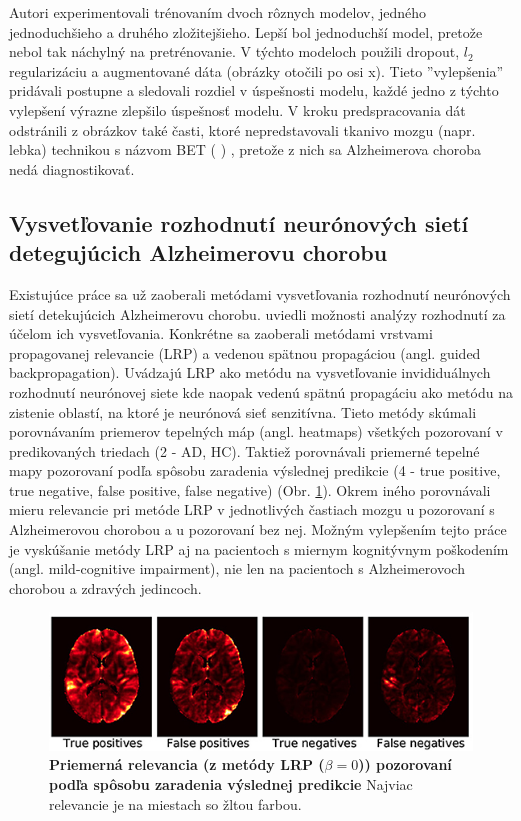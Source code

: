 Autori experimentovali trénovaním dvoch rôznych modelov, jedného jednoduchšieho a druhého zložitejšieho. Lepší bol jednoduchší model, pretože nebol tak náchylný na pretrénovanie. V týchto modeloch použili dropout, $l_2$ regularizáciu a augmentované dáta (obrázky otočili po osi x). Tieto ''vylepšenia'' pridávali postupne a sledovali rozdiel v úspešnosti modelu, každé jedno z týchto vylepšení výrazne zlepšilo úspešnosť modelu. V kroku predspracovania dát odstránili z obrázkov také časti, ktoré nepredstavovali tkanivo mozgu (napr. lebka) technikou s názvom BET (\citeauthor*{smith2002fast} \citeyear{smith2002fast}) \cite{smith2002fast}, pretože z nich sa Alzheimerova choroba nedá diagnostikovať.


\subsection{Vysvetľovanie rozhodnutí neurónových sietí detegujúcich Alzheimerovu chorobu \label{sec:ad_nn_explanation}}

Existujúce práce sa už zaoberali metódami vysvetľovania rozhodnutí neurónových sietí detekujúcich Alzheimerovu chorobu. \citeauthor{bohle2019layer} \citeyear{bohle2019layer} uviedli možnosti analýzy rozhodnutí za účelom ich vysvetľovania. Konkrétne sa zaoberali metódami vrstvami propagovanej relevancie (LRP) a vedenou spätnou propagáciou (angl. guided backpropagation). Uvádzajú LRP ako metódu na vysvetľovanie invididuálnych rozhodnutí neurónovej siete kde naopak vedenú spätnú propagáciu ako metódu na zistenie oblastí, na ktoré je neurónová sieť senzitívna. Tieto metódy skúmali porovnávaním priemerov tepelných máp (angl. heatmaps) všetkých pozorovaní v predikovaných triedach (2 - AD, HC). Taktiež porovnávali priemerné tepelné mapy pozorovaní podľa spôsobu zaradenia výslednej predikcie (4 - true positive, true negative, false positive, false negative) (Obr. \ref{fig:lrp_alzheimer}). Okrem iného porovnávali mieru relevancie pri metóde LRP v jednotlivých častiach mozgu u pozorovaní s Alzheimerovou chorobou a u pozorovaní bez nej. Možným vylepšením tejto práce je vyskúšanie metódy LRP aj na pacientoch s miernym kognitývnym poškodením (angl. mild-cognitive impairment), nie len na pacientoch s Alzheimerovoch chorobou a zdravých jedincoch.


\begin{figure}[h!]
\centering
\includegraphics[scale=0.4]{assets/images/lrp_alzheimer.png}
\caption{\textbf{Priemerná relevancia (z metódy LRP ($\beta = 0$)) pozorovaní podľa spôsobu zaradenia výslednej predikcie}
Najviac relevancie je na miestach so žltou farbou.
}
\label{fig:lrp_alzheimer}
\end{figure}

